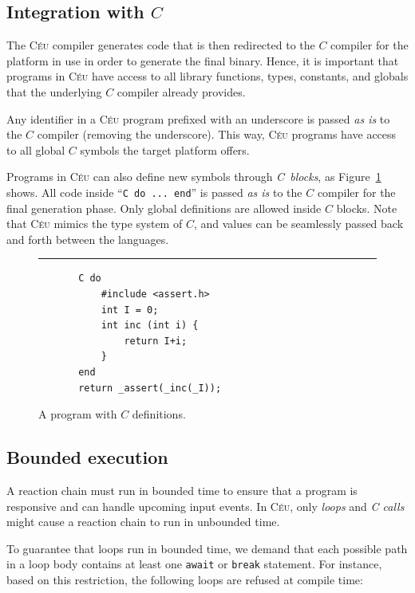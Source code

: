 \documentclass[11pt,a4paper]{article}
\newcommand{\2}{\;\;}
\newcommand{\5}{\;\;\;\;\;}
\newcommand{\CEU}{\textsc{C\'{e}u}}
\newcommand{\code}[1] {{\small{\texttt{#1}}}}
\begin{document}
\subsection{Integration with $C$}
\label{sec:ceu:c}

The \CEU{} compiler generates code that is then redirected to the $C$ compiler 
for the platform in use in order to generate the final binary.
Hence, it is important that programs in \CEU{} have access to all library 
functions, types, constants, and globals that the underlying $C$ compiler 
already provides.

Any identifier in a \CEU{} program prefixed with an underscore is passed 
\emph{as is} to the $C$ compiler (removing the underscore).
This way, \CEU{} programs have access to all global $C$ symbols the target 
platform offers.

Programs in \CEU{} can also define new symbols through \emph{C~blocks}, as 
Figure~\ref{lst:ceu:c} shows.
All code inside ``\code{C do ... end}'' is passed \emph{as is} to the $C$ 
compiler for the final generation phase.
Only global definitions are allowed inside $C$ blocks.
Note that \CEU{} mimics the type system of $C$, and values can be seamlessly 
passed back and forth between the languages.

\begin{figure}[h]
\rule{15cm}{0.37pt}
{\small
\begin{verbatim}
       C do
           #include <assert.h>
           int I = 0;
           int inc (int i) {
               return I+i;
           }
       end
       return _assert(_inc(_I));
\end{verbatim}
}
\caption{ A program with $C$ definitions.
\label{lst:ceu:c}
}
\end{figure}

\subsection{Bounded execution}
\label{sec:ceu:bounded}

A reaction chain must run in bounded time to ensure that a program is 
responsive and can handle upcoming input events.
In \CEU, only \emph{loops} and \emph{C calls} might cause a reaction chain to 
run in unbounded time.

To guarantee that loops run in bounded time, we demand that each possible path 
in a loop body contains at least one \code{await} or \code{break} statement.
For instance, based on this restriction, the following loops are refused at 
compile time:
\end{document}
